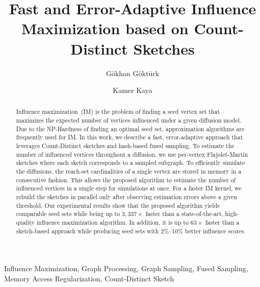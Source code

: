 \documentclass[review]{elsarticle}
\begin{document}
\begin{frontmatter}
\title{Fast and Error-Adaptive Influence Maximization based on Count-Distinct Sketches}%

\author[add]{Gökhan Göktürk}

\author[add]{Kamer Kaya}

\address[add]{Faculty of Engineering and Natural Sciences, Sabancı University, Turkey}


\begin{abstract}
Influence maximization~(IM) is the problem of finding a seed vertex set that maximizes the expected number of vertices influenced under a given diffusion model. Due to the NP-Hardness of finding an optimal seed set, approximation algorithms are frequently used for IM. 
In this work, we describe a fast, error-adaptive approach that leverages Count-Distinct sketches and hash-based fused sampling. To estimate the number of influenced vertices throughout a diffusion, we use per-vertex Flajolet-Martin sketches where each sketch corresponds to a sampled subgraph. To efficiently simulate the diffusions, the reach-set cardinalities of a single vertex are stored in memory in a consecutive fashion. This allows the proposed algorithm to estimate the number of influenced vertices in a single step for simulations at once. %
For a faster IM kernel, we rebuild the sketches in parallel only after observing estimation errors above a given threshold. Our experimental results show that the proposed algorithm yields comparable seed sets while being up to $3,337\times$ faster than a state-of-the-art, high-quality influence maximization algorithm. In addition, it is up to $63\times$ faster than a sketch-based approach while producing seed sets with $2\%$--$10\%$ better influence scores.
\end{abstract}
\begin{keyword}
Influence Maximization, Graph Processing, Graph Sampling, Fused Sampling, Memory Access Regularization, Count-Distinct Sketch
\end{keyword}
\end{frontmatter}
\end{document}
